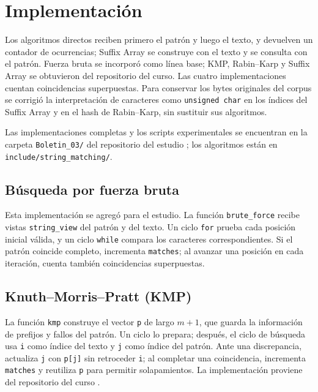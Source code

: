\section{Implementación}

Los algoritmos directos reciben primero el patrón y luego el texto, y devuelven
un contador de ocurrencias; Suffix Array se construye con el texto y se consulta
con el patrón. Fuerza bruta se incorporó como línea base; KMP,
Rabin--Karp y Suffix Array se obtuvieron del repositorio del curso. Las cuatro implementaciones cuentan coincidencias
superpuestas. Para conservar los bytes originales del corpus se corrigió la
interpretación de caracteres como \texttt{unsigned char} en los índices del
Suffix Array y en el hash de Rabin--Karp, sin sustituir sus algoritmos.

Las implementaciones completas y los scripts experimentales se encuentran en
la carpeta \texttt{Boletin\_03/} del repositorio del estudio
\cite{repositorio-experimentos}; los algoritmos están en
\texttt{include/string\_matching/}.

\subsection{Búsqueda por fuerza bruta}

Esta implementación se agregó para el estudio. La función \texttt{brute\_force}
recibe vistas \texttt{string\_view} del patrón y del texto. Un ciclo \texttt{for}
prueba cada posición inicial válida, y un ciclo \texttt{while} compara los
caracteres correspondientes. Si el patrón coincide completo, incrementa
\texttt{matches}; al avanzar una posición en cada iteración, cuenta también
coincidencias superpuestas.

\subsection{Knuth--Morris--Pratt (KMP)}

La función \texttt{kmp} construye el vector \texttt{p} de largo \(m+1\), que
guarda la información de prefijos y fallos del patrón. Un ciclo lo prepara;
después, el ciclo de búsqueda usa \texttt{i} como índice del texto y \texttt{j}
como índice del patrón. Ante una discrepancia, actualiza \texttt{j} con
\texttt{p[j]} sin retroceder \texttt{i}; al completar una coincidencia,
incrementa \texttt{matches} y reutiliza \texttt{p} para permitir solapamientos.
La implementación proviene del repositorio del curso \cite{edaa-kmp}.


